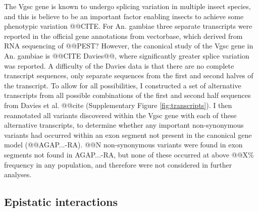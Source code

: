 \documentclass[a4paper,11pt,abstracton,hidelinks]{scrartcl}
\begin{document}
{\begin{landscape}
\begin{table}[h]
\begin{threeparttable}
\begin{tablenotes}
  \end{tablenotes}

  \end{threeparttable}

\end{table}
\end{landscape}
\restoregeometry
} %


%
The Vgsc gene is known to undergo splicing variation in multiple insect species, and this is believe to be an important factor enabling insects to achieve some phenotypic variation @@CITE.
%
For An. gambiae three separate transcripts were reported in the official gene annotations from vectorbase, which derived from RNA sequencing of @@PEST?
%
However, the canonical study of the Vgsc gene in An. gambiae is @@CITE Davies@@, where significantly greater splice variation was reported.
%
A difficulty of the Davies data is that there are no complete transcript sequences, only separate sequences from the first and second halves of the transcript.
%
To allow for all possibilities, I constructed a set of alternative transcripts from all possible combinations of the first and second half sequences from Davies et al. @@cite (Supplementary Figure \ref{fig:transcripts}).
%
I then reannotated all variants discovered within the Vgsc gene with each of these alternative transcripts, to determine whether any important non-synonymous variants had occurred within an exon segment not present in the canonical gene model (@@AGAP...-RA).
%
@@N non-synonymous variants were found in exon segments not found in AGAP...-RA, but none of these occurred at above @@X\% frequency in any population, and therefore were not considered in further analyses.


\subsection*{Epistatic interactions}
\end{document}
